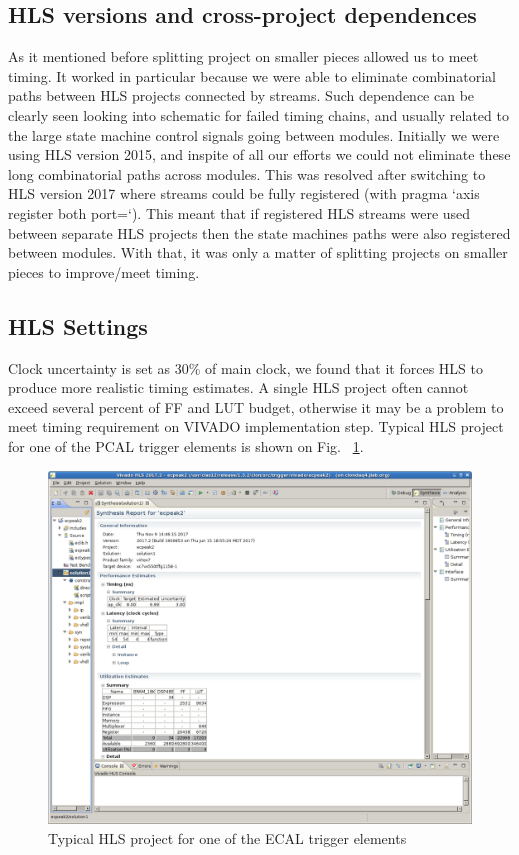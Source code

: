 \subsection{HLS versions and cross-project dependences}

As it mentioned before splitting project on smaller pieces allowed us to meet timing. It worked in particular because we were able to eliminate combinatorial paths between HLS projects connected by streams. Such dependence can be clearly seen looking into schematic for failed timing chains, and usually related to the large state machine control signals going between modules. Initially we were using HLS version 2015, and inspite of all our efforts we could not eliminate these long combinatorial paths across modules. This was resolved after switching to HLS version 2017 where streams could be fully registered (with pragma ‘axis register both port=‘). This meant that if registered HLS streams were used between separate HLS projects then the state machines paths were also registered between modules. With that, it was only a matter of splitting projects on smaller pieces to improve/meet timing.


\subsection{HLS Settings}

Clock uncertainty is set as 30\% of main clock, we found that it forces HLS to produce more realistic timing estimates. A single HLS project often cannot exceed several percent of FF and LUT budget, otherwise it may be a problem to meet timing requirement on VIVADO implementation step. Typical HLS project for one of the PCAL trigger elements is shown on Fig. ~\ref{fig:hls}.

\begin{figure}[hbt]
	\centering
	\includegraphics[width=1.0\columnwidth,keepaspectratio]{img/hls.png}
	\caption{Typical HLS project for one of the ECAL trigger elements}
	\label{fig:hls}
\end{figure}


